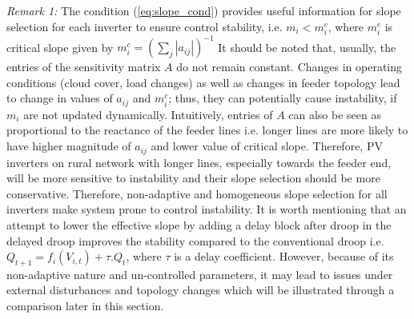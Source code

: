 \documentclass[journal]{IEEEtran}
\begin{document}
\textit{Remark 1:} The condition (\ref{eq:slope_cond}) provides useful information for slope selection for each inverter to ensure control stability, i.e. {\small $m_i\!<\!m_i^c$}, where $m_i^c$ is critical slope given by 
$m_i^c\!=\!(\sum_j|a_{ij}|)^{-1}$
It should be noted that, usually, the entries of the sensitivity matrix $A$ do not remain constant. Changes in operating conditions (cloud cover, load changes) as well as changes in feeder topology lead to change in values of $a_{ij}$ and $m_i^c$; thus, they can potentially cause instability, if $m_i$ are not updated dynamically. Intuitively, entries of $A$ can also be seen as proportional to the reactance of the feeder lines \cite{farivar_equilibrium_2013} i.e. longer lines are more likely to have higher magnitude of $a_{ij}$ and lower value of critical slope. Therefore, PV inverters on rural network with longer lines, especially towards the feeder end, will be more sensitive to instability and their slope selection should be more conservative. Therefore, non-adaptive and homogeneous slope selection for all inverters make system prone to control instability. 
It is worth mentioning that an attempt to lower the effective slope by adding a delay block after droop in the delayed droop \cite{jahangiri_distributed_2013} improves the stability compared to the conventional droop i.e. $Q_{t+1}=f_i(V_{i,t})+\tau. Q_t$, where $\tau$ is a delay coefficient. However, because of its non-adaptive nature and un-controlled parameters, it may lead to issues under external disturbances and topology changes which will be illustrated through a comparison later in this section.
\end{document}
